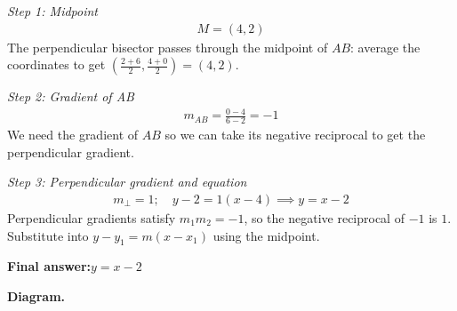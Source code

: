 \documentclass[11pt]{article}
\begin{document}
\textit{Step 1: Midpoint}
\[\begin{gathered}
M = (4, 2)
\end{gathered}\]
The perpendicular bisector passes through the midpoint of \(AB\): average the coordinates to get \(\left(\tfrac{2+6}{2}, \tfrac{4+0}{2}\right) = (4, 2)\).

\textit{Step 2: Gradient of AB}
\[\begin{gathered}
m_{AB} = \frac{0-4}{6-2} = -1
\end{gathered}\]
We need the gradient of \(AB\) so we can take its negative reciprocal to get the perpendicular gradient.

\textit{Step 3: Perpendicular gradient and equation}
\[\begin{gathered}
m_{\perp} = 1; \quad y - 2 = 1(x - 4) \implies y = x - 2
\end{gathered}\]
Perpendicular gradients satisfy \(m_1 m_2 = -1\), so the negative reciprocal of \(-1\) is \(1\). Substitute into \(y - y_1 = m(x - x_1)\) using the midpoint.

\begin{answerbox}
\textbf{Final answer:}\quad \(\displaystyle y = x - 2\)
\end{answerbox}
\textbf{Diagram.}
\end{document}
